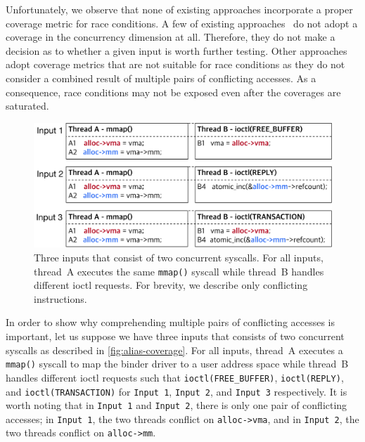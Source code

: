Unfortunately, we observe that none of existing approaches incorporate
a proper coverage metric for race conditions.
%
A few of existing approaches~\cite{snowboard, razzer} do not adopt a
coverage in the concurrency dimension at all. Therefore, they do not
make a decision as to whether a given input is worth further testing.
%
Other approaches~\cite{krace, muzz} adopt coverage metrics that are
not suitable for race conditions as they do not consider a combined
result of multiple pairs of conflicting accesses. As a consequence,
race conditions may not be exposed even after the coverages are
saturated.
%


\begin{figure}[t]
  \centering
  \includegraphics[width=0.98\linewidth]{fig/alias-coverage.pdf}
  \caption{Three inputs that consist of two concurrent syscalls. For
    all inputs, thread~A executes the same \texttt{mmap()} syscall
    while thread~B handles different ioctl requests. For brevity, we
    describe only conflicting instructions.}
  \label{fig:alias-coverage}
\end{figure}

%
In order to show why comprehending multiple pairs of conflicting
accesses is important, let us suppose we have three inputs that
consists of two concurrent syscalls as described in
\autoref{fig:alias-coverage}.
%
For all inputs, thread~A executes a \texttt{mmap()} syscall to map the
binder driver to a user address space while thread~B handles different
ioctl requests such that \texttt{ioctl(FREE_BUFFER)},
\texttt{ioctl(REPLY)}, and \texttt{ioctl(TRANSACTION)} for
\texttt{Input 1}, \texttt{Input 2}, and \texttt{Input 3} respectively.
%
It is worth noting that in \texttt{Input 1} and \texttt{Input 2},
there is only one pair of conflicting accesses; in \texttt{Input 1},
the two threads conflict on \texttt{alloc->vma}, and in \texttt{Input
  2}, the two threads conflict on \texttt{alloc->mm}.



